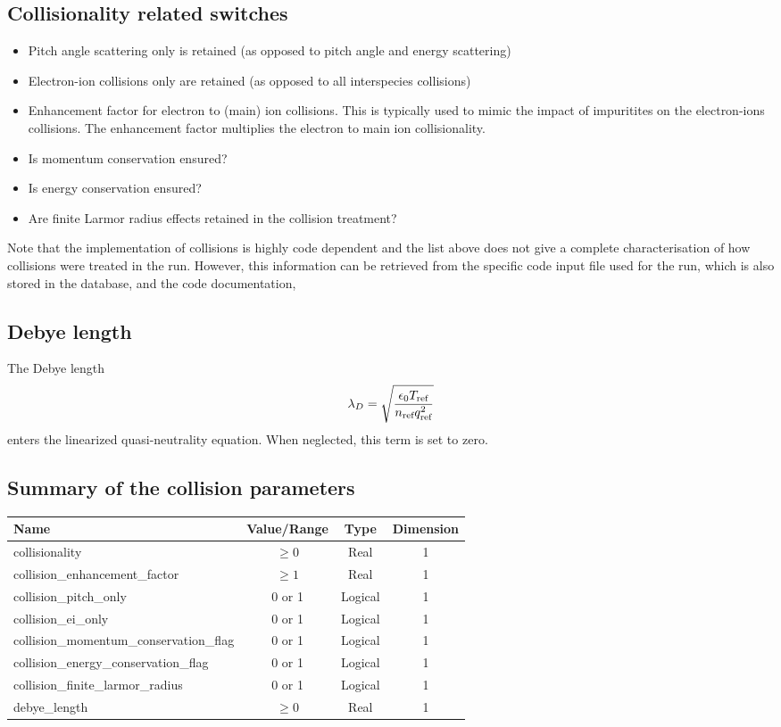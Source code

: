 \documentclass[a4paper]{report}
\begin{document}
\subsection{Collisionality related switches} \label{sec:colswitches}
\begin{itemize}
\item Pitch angle scattering only is retained (as opposed to pitch angle and energy scattering)
\item Electron-ion collisions only are retained (as opposed to all interspecies collisions)
\item Enhancement factor for electron to (main) ion collisions. This is typically used to mimic the impact of impuritites on the electron-ions collisions. The enhancement factor multiplies the electron to main ion collisionality.
\item Is momentum conservation ensured?
\item Is energy conservation ensured?
\item Are finite Larmor radius effects retained in the collision treatment?
\end{itemize}
Note that the implementation of collisions is highly code dependent and the list above does not give a complete characterisation of how collisions were treated in the run. However, this information can be retrieved from the specific code input file used for the run, which is also stored in the database, and the code documentation,\\

\subsection{Debye length}
The Debye length
\begin{equation}
 \lambda_{D}= \sqrt{\frac{\epsilon_0 T_{\textrm{ref}}}{n_{\textrm{ref}} q_{\textrm{ref}}^2}}
\end{equation}
enters the linearized quasi-neutrality equation. When neglected, this term is set to zero.

\subsection{Summary of the collision parameters}
\begin{tabularx}{\textwidth}{|L|S|S|S|}
\hline
Name & Value/Range & Type & Dimension \\
\hline
collisionality & $\geq 0$ & Real & 1 \\
collision\_enhancement\_factor & $\geq 1$ & Real & 1 \\
collision\_pitch\_only & 0 or 1 & Logical & 1 \\
collision\_ei\_only & 0 or 1 & Logical & 1 \\
collision\_momentum\_conservation\_flag & 0 or 1 & Logical & 1 \\
collision\_energy\_conservation\_flag & 0 or 1 & Logical & 1 \\
collision\_finite\_larmor\_radius & 0 or 1 & Logical & 1 \\
debye\_length & $\geq 0$ & Real & 1 \\
\hline
\end{tabularx}
\end{document}
